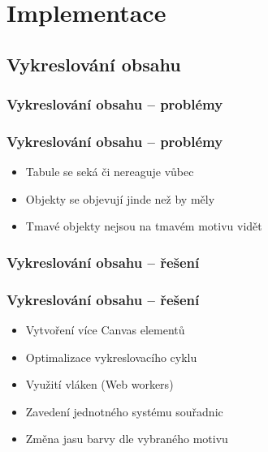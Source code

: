 \documentclass{beamer}
\begin{document}
\section{Implementace}
\subsection{Vykreslování obsahu}
\subsubsection{Vykreslování obsahu -- problémy}
\begin{frame}
    \frametitle{Vykreslování obsahu -- problémy}
    \begin{itemize}
        \item Tabule se seká či nereaguje vůbec
        \item Objekty se objevují jinde než by měly
        \item Tmavé objekty nejsou na tmavém motivu vidět
    \end{itemize}
\end{frame}

\subsubsection{Vykreslování obsahu -- řešení}
\begin{frame}
    \frametitle{Vykreslování obsahu -- řešení}
    \begin{itemize}
        \item Vytvoření více Canvas elementů
        \item Optimalizace vykreslovacího cyklu
        \item Využití vláken (Web workers)
        \bigskip
        \item Zavedení jednotného systému souřadnic
        \bigskip
        \item Změna jasu barvy dle vybraného motivu
    \end{itemize}
\end{frame}
\end{document}
